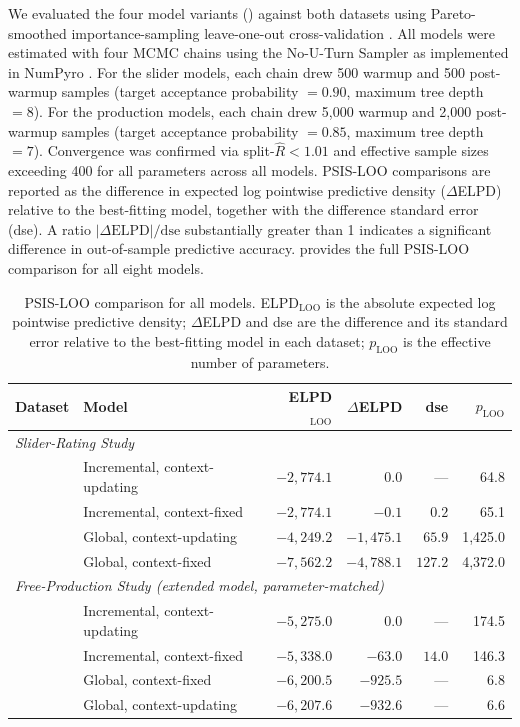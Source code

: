 \documentclass[man,floatsintext]{apa7}
\begin{document}
We evaluated the four model variants () against both datasets using Pareto-smoothed importance-sampling leave-one-out cross-validation \citep[PSIS-LOO;][]{vehtari2017practical}.
All models were estimated with four MCMC chains using the No-U-Turn Sampler \citep[NUTS;][]{hoffman2014no} as implemented in NumPyro \citep{phan2019composable}.
For the slider models, each chain drew 500 warmup and 500 post-warmup samples (target acceptance probability $= 0.90$, maximum tree depth $= 8$).
For the production models, each chain drew 5{,}000 warmup and 2{,}000 post-warmup samples (target acceptance probability $= 0.85$, maximum tree depth $= 7$).
Convergence was confirmed via split-$\hat{R} < 1.01$ and effective sample sizes exceeding 400 for all parameters across all models.
PSIS-LOO comparisons are reported as the difference in expected log pointwise predictive density ($\Delta$ELPD) relative to the best-fitting model, together with the difference standard error (dse).
A ratio $|\Delta\text{ELPD}|/\text{dse}$ substantially greater than 1 indicates a significant difference in out-of-sample predictive accuracy.
 provides the full PSIS-LOO comparison for all eight models.

\begin{table}[htbp]
\centering
\caption{PSIS-LOO comparison for all models.
ELPD$_{\text{LOO}}$ is the absolute expected log pointwise predictive density; $\Delta$ELPD and dse are the difference and its standard error relative to the best-fitting model in each dataset; $p_{\text{LOO}}$ is the effective number of parameters.}
\label{tab:loo-summary}
\small
\begin{tabular}{llrrrr}
\hline
Dataset & Model & ELPD$_{\text{LOO}}$ & $\Delta$ELPD & dse & $p_{\text{LOO}}$ \\
\hline
\multicolumn{6}{l}{\textit{Slider-Rating Study}} \\
 & Incremental, context-updating & $-2{,}774.1$ & $0.0$ & --- & 64.8 \\
 & Incremental, context-fixed & $-2{,}774.1$ & $-0.1$ & $0.2$ & 65.1 \\
 & Global, context-updating & $-4{,}249.2$ & $-1{,}475.1$ & $65.9$ & 1{,}425.0 \\
 & Global, context-fixed & $-7{,}562.2$ & $-4{,}788.1$ & $127.2$ & 4{,}372.0 \\[4pt]
\multicolumn{6}{l}{\textit{Free-Production Study (extended model, parameter-matched)}} \\
 & Incremental, context-updating & $-5{,}275.0$ & $0.0$ & --- & 174.5 \\
 & Incremental, context-fixed & $-5{,}338.0$ & $-63.0$ & $14.0$ & 146.3 \\
 & Global, context-fixed & $-6{,}200.5$ & $-925.5$ & --- & 6.8 \\
 & Global, context-updating & $-6{,}207.6$ & $-932.6$ & --- & 6.6 \\
\hline
\end{tabular}
\end{table}
\end{document}
